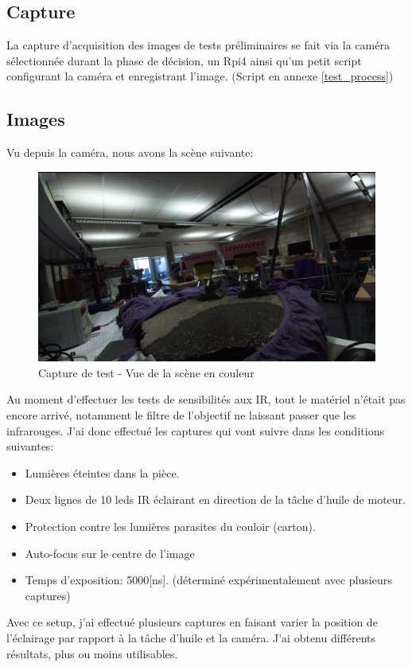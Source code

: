 \subsection{Capture}
La capture d'acquisition des images de tests préliminaires se fait via la caméra sélectionnée durant la phase de décision, un Rpi4 ainsi
qu'un petit script configurant la caméra et enregistrant l'image. (Script en annexe \ref{test_process})
\newpage
\subsection{Images}
Vu depuis la caméra, nous avons la scène suivante:

\begin{figure}[H]
    \centering
    \includegraphics[width=13cm]{assets/figures/camera_vue_couleur1.png}
    \caption{Capture de test - Vue de la scène en couleur}
\end{figure}

Au moment d'effectuer les tests de sensibilités aux IR, tout le matériel n'était pas encore arrivé, notamment le filtre de l'objectif ne
laissant passer que les infrarouges. J'ai donc effectué les captures qui vont suivre dans les conditions suivantes:
\begin{itemize}
    \item Lumières éteintes dans la pièce.
    \item Deux lignes de 10 leds IR éclairant en direction de la tâche d'huile de moteur.
    \item Protection contre les lumières parasites du couloir (carton).
    \item Auto-focus sur le centre de l'image
    \item Temps d'exposition: 5000[ns]. (déterminé expérimentalement avec plusieurs captures)
\end{itemize}
Avec ce setup, j'ai effectué plusieurs captures en faisant varier la position de l'éclairage par rapport à la tâche d'huile et la caméra.
J'ai obtenu différents résultats, plus ou moins utilisables.


